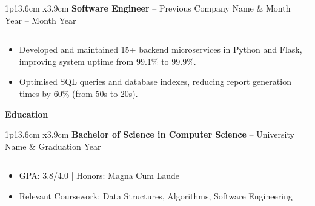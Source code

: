 \documentclass[10pt,a4paper]{article}
\newcommand{\cvsection}[1]{
    \vspace{8pt}
    \begin{center}
        \large\textcolor{sectcol}{\textbf{#1}}
    \end{center}
    \vspace{-4pt}
}
\newcommand{\cvevent}[3]{
    \begin{tabular*}{1\textwidth}{p{13.6cm} x{3.9cm}}
        \textbf{#2} -- \textcolor{bgcol}{#3} & \vspace{2.5pt}\textcolor{sectcol}{#1}
    \end{tabular*}
    \vspace{-8pt}
    \textcolor{softcol}{\hrule}
    \vspace{4pt}
}
\begin{document}
\cvevent{Month Year -- Month Year}{Software Engineer}{Previous Company Name}
\begin{itemize}
    \item Developed and maintained 15+ backend microservices in Python and Flask, improving system uptime from 99.1\% to 99.9\%.
    \item Optimised SQL queries and database indexes, reducing report generation times by 60\% (from 50s to 20s).
\end{itemize}
\vspace{4pt}

\cvsection{Education}

\cvevent{Graduation Year}{Bachelor of Science in Computer Science}{University Name}
\begin{itemize}
    \item GPA: 3.8/4.0 | Honors: Magna Cum Laude
    \item Relevant Coursework: Data Structures, Algorithms, Software Engineering
\end{itemize}
\end{document}
